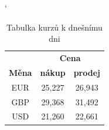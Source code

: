 \documentclass[11pt]{article}
\begin{document}
\vspace{5mm}
\begin{table}[ht]
    \begin{center} \catcode `
        \begin{tabular}{|c|c|c|}\hline
                          & \multicolumn{2}{c}{\textbf{Cena}}\vline \\ \cline{2-3}
            \textbf{Měna} & \textbf{nákup}  & \textbf{prodej} \\ \hline
              EUR         & 25,227          &     26,943      \\ 
              GBP         & 29,368          &     31,492      \\
              USD         & 21,260          &     22,661      \\ \hline
        \end{tabular}
        \caption{Tabulka kurzů k dnešnímu dni}
        \label{tab1}
    \end{center}
\end{table}
\end{document}
